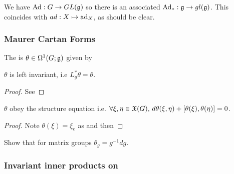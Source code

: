 \documentclass{article}
\begin{document}
\begin{example}
	We have $\Ad:G \to GL(\mf{g})$ so there is an associated $\Ad_\ast : \mf{g} \to gl(\mf{g})$. This coincides with $ad : X \mapsto \ad_X$, as should be clear. 
\end{example}

\subsubsection{Maurer Cartan Forms}

\begin{definition}
	The  is $\theta \in \Omega^1(G;\mf{g})$ given by 
\end{definition}

\begin{lemma}
	$\theta$ is left invariant, i.e $L_g^\ast \theta = \theta$.
\end{lemma}
\begin{proof}
	See
\end{proof}

\begin{prop}
	$\theta$ obey the structure equation 
i.e. $\forall \xi, \eta \in \mf{X}(G), \, d\theta(\xi,\eta) + \comm[\theta(\xi)]{\theta(\eta)} = 0$.
\end{prop}
\begin{proof}
	Note $\theta(\xi) = \xi_e$ as 
and then 

\end{proof}

\begin{ex}
	Show that for matrix groups $\theta_g = g^{-1}dg$.
\end{ex}

\subsubsection{Invariant inner products on }
	
\end{document}

